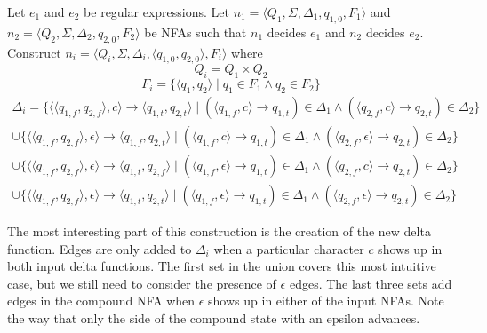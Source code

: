 Let $e_1$ and $e_2$ be regular expressions. Let
$n_1 = \langle Q_1, \Sigma, \Delta_1, q_{1,0}, F_1 \rangle$ and
$n_2 = \langle Q_2, \Sigma, \Delta_2, q_{2,0}, F_2 \rangle$
be NFAs such that $n_1$ decides $e_1$ and $n_2$ decides $e_2$.
Construct $n_i = \langle Q_i, \Sigma, \Delta_i, \langle q_{1,0}, q_{2,0} \rangle, F_i \rangle$
where
$$Q_i = Q_1 \times Q_2$$
$$F_i = \{ \langle q_1, q_2 \rangle \mid q_1 \in F_1 \wedge q_2 \in F_2\}$$
\begin{equation}
\begin{split}
  \Delta_i =
    \{ \langle \langle q_{1, f}, q_{2, f} \rangle, c \rangle
            \rightarrow \langle q_{1, t}, q_{2, t} \rangle
        \mid
          (\langle q_{1, f}, c \rangle \rightarrow q_{1, t}) \in \Delta_1
          \wedge
          (\langle q_{2, f}, c \rangle \rightarrow q_{2, t}) \in \Delta_2
     \} \\
     \cup
     \{
        \langle \langle q_{1, f}, q_{2, f} \rangle, \epsilon \rangle
          \rightarrow \langle q_{1, f}, q_{2, t} \rangle
        \mid
          (\langle q_{1, f}, c \rangle \rightarrow q_{1, t}) \in \Delta_1
          \wedge
          (\langle q_{2, f}, \epsilon \rangle \rightarrow q_{2, t}) \in \Delta_2
     \} \\
     \cup
     \{
        \langle \langle q_{1, f}, q_{2, f} \rangle, \epsilon \rangle
          \rightarrow \langle q_{1, t}, q_{2, f} \rangle
        \mid
          (\langle q_{1, f}, \epsilon \rangle \rightarrow q_{1, t}) \in \Delta_1
          \wedge
          (\langle q_{2, f}, c \rangle \rightarrow q_{2, t}) \in \Delta_2
   \} \\
     \cup
     \{
        \langle \langle q_{1, f}, q_{2, f} \rangle, \epsilon \rangle
          \rightarrow \langle q_{1, t}, q_{2, t} \rangle
        \mid
          (\langle q_{1, f}, \epsilon \rangle \rightarrow q_{1, t}) \in \Delta_1
          \wedge
          (\langle q_{2, f}, \epsilon \rangle \rightarrow q_{2, t}) \in \Delta_2
       \}
\end{split}
\end{equation}

The most interesting part of this construction is the creation of the
new delta function. Edges are only added to $\Delta_i$ when a particular
character $c$ shows up in both input delta functions. The first set in
the union covers this most intuitive case, but we still need to consider
the presence of $\epsilon$ edges. The last three sets add edges in the
compound NFA when $\epsilon$ shows up in either of the input NFAs.
Note the way that only the side of the compound state with an
epsilon advances.

